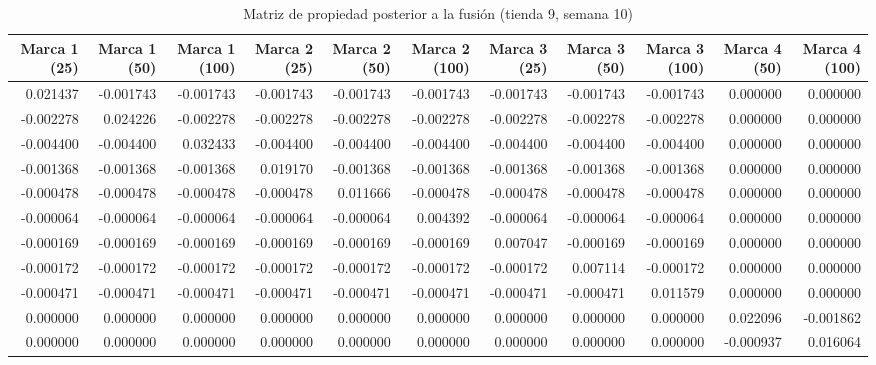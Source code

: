 \begin{table}
\centering
\caption{Matriz de propiedad posterior a la fusión (tienda 9, semana 10)}
\begin{tabular}{rrrrrrrrrrr}
\toprule
 Marca 1 (25) &  Marca 1 (50) &  Marca 1 (100) &  Marca 2 (25) &  Marca 2 (50) &  Marca 2 (100) &  Marca 3 (25) &  Marca 3 (50) &  Marca 3 (100) &  Marca 4 (50) &  Marca 4 (100) \\
\midrule
     0.021437 &     -0.001743 &      -0.001743 &     -0.001743 &     -0.001743 &      -0.001743 &     -0.001743 &     -0.001743 &      -0.001743 &      0.000000 &       0.000000 \\
    -0.002278 &      0.024226 &      -0.002278 &     -0.002278 &     -0.002278 &      -0.002278 &     -0.002278 &     -0.002278 &      -0.002278 &      0.000000 &       0.000000 \\
    -0.004400 &     -0.004400 &       0.032433 &     -0.004400 &     -0.004400 &      -0.004400 &     -0.004400 &     -0.004400 &      -0.004400 &      0.000000 &       0.000000 \\
    -0.001368 &     -0.001368 &      -0.001368 &      0.019170 &     -0.001368 &      -0.001368 &     -0.001368 &     -0.001368 &      -0.001368 &      0.000000 &       0.000000 \\
    -0.000478 &     -0.000478 &      -0.000478 &     -0.000478 &      0.011666 &      -0.000478 &     -0.000478 &     -0.000478 &      -0.000478 &      0.000000 &       0.000000 \\
    -0.000064 &     -0.000064 &      -0.000064 &     -0.000064 &     -0.000064 &       0.004392 &     -0.000064 &     -0.000064 &      -0.000064 &      0.000000 &       0.000000 \\
    -0.000169 &     -0.000169 &      -0.000169 &     -0.000169 &     -0.000169 &      -0.000169 &      0.007047 &     -0.000169 &      -0.000169 &      0.000000 &       0.000000 \\
    -0.000172 &     -0.000172 &      -0.000172 &     -0.000172 &     -0.000172 &      -0.000172 &     -0.000172 &      0.007114 &      -0.000172 &      0.000000 &       0.000000 \\
    -0.000471 &     -0.000471 &      -0.000471 &     -0.000471 &     -0.000471 &      -0.000471 &     -0.000471 &     -0.000471 &       0.011579 &      0.000000 &       0.000000 \\
     0.000000 &      0.000000 &       0.000000 &      0.000000 &      0.000000 &       0.000000 &      0.000000 &      0.000000 &       0.000000 &      0.022096 &      -0.001862 \\
     0.000000 &      0.000000 &       0.000000 &      0.000000 &      0.000000 &       0.000000 &      0.000000 &      0.000000 &       0.000000 &     -0.000937 &       0.016064 \\
\bottomrule
\end{tabular}
\end{table}

